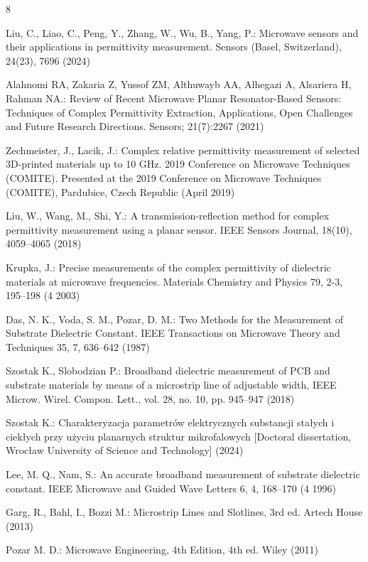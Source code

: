 \begin{thebibliography}{8}

Liu, C., Liao, C., Peng, Y., Zhang, W., Wu, B., Yang, P.: Microwave sensors and their applications in permittivity measurement. Sensors (Basel, Switzerland), 24(23), 7696 (2024)

Alahnomi RA, Zakaria Z, Yussof ZM, Althuwayb AA, Alhegazi A, Alsariera H, Rahman NA.: Review of Recent Microwave Planar Resonator-Based Sensors: Techniques of Complex Permittivity Extraction, Applications, Open Challenges and Future Research Directions. Sensors; 21(7):2267 (2021)

Zechmeister, J., Lacik, J.: Complex relative permittivity measurement of selected 3D-printed materials up to 10 GHz. 2019 Conference on Microwave Techniques (COMITE). Presented at the 2019 Conference on Microwave Techniques (COMITE), Pardubice, Czech Republic (April 2019)

Liu, W., Wang, M., Shi, Y.: A transmission-reflection method for complex permittivity measurement using a planar sensor. IEEE Sensors Journal, 18(10), 4059–4065 (2018)

Krupka, J.: Precise measurements of the complex permittivity of dielectric materials at microwave
frequencies. Materials Chemistry and Physics 79, 2-3, 195–198 (4 2003)

Das, N. K., Voda, S. M., Pozar, D. M.: Two Methods for the Measurement of Substrate Dielectric
Constant. IEEE Transactions on Microwave Theory and Techniques 35, 7, 636–642 (1987)

Szostak K., Slobodzian P.: Broadband dielectric measurement of PCB and substrate materials by means of a microstrip line of adjustable width, IEEE Microw. Wirel. Compon. Lett., vol. 28, no. 10, pp. 945–947 (2018)

Szostak K.: Charakteryzacja parametrów elektrycznych substancji stałych i ciekłych przy użyciu planarnych struktur mikrofalowych [Doctoral dissertation, Wrocław University of Science and Technology] (2024)

Lee, M. Q., Nam, S.: An accurate broadband measurement of substrate dielectric constant. IEEE
Microwave and Guided Wave Letters 6, 4, 168–170 (4 1996)

Garg, R., Bahl, I., Bozzi M.: Microstrip Lines and Slotlines, 3rd ed. Artech House (2013)

Pozar M. D.: Microwave Engineering, 4th Edition, 4th ed. Wiley (2011)

\end{thebibliography}